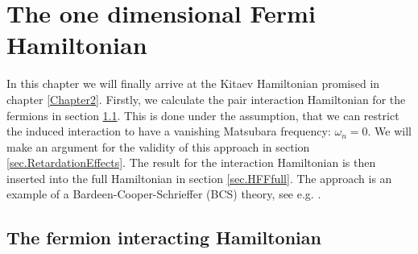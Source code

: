 
\chapter{The one dimensional Fermi Hamiltonian} %

\label{Chapter4} %


In this chapter we will finally arrive at the Kitaev Hamiltonian promised in chapter \ref{Chapter2}. Firstly, we calculate the pair interaction Hamiltonian for the fermions in section \ref{sec.HFFint}. This is done under the assumption, that we can restrict the induced interaction to have a vanishing Matsubara frequency: $\omega_n = 0$. We will make an argument for the validity of this approach in section \ref{sec.RetardationEffects}. The result for the interaction Hamiltonian is then inserted into the full Hamiltonian in section \ref{sec.HFFfull}. The approach is an example of a Bardeen-Cooper-Schrieffer (BCS) theory, see e.g. \cite{Tinkham,LandauStatPhys2,PlischkeStatPhys}. 

\section{The fermion interacting Hamiltonian} \label{sec.HFFint}

